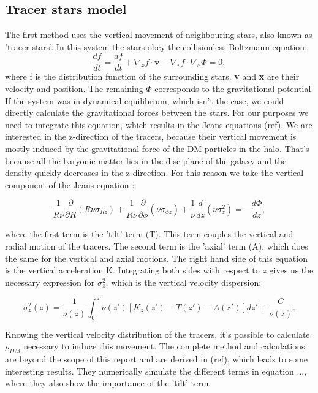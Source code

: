 \documentclass{article}
\begin{document}
\subsection{Tracer stars model}
The first method uses the vertical movement of neighbouring stars, also known as 'tracer stars'. In this system the stars obey the collisionless Boltzmann equation:
\begin{equation}
    \frac{df}{dt} = \frac{df}{dt} + \nabla_{x}f\cdot \textbf{v} - \nabla_{v}f\cdot\nabla_{x}\Phi = 0,
\end{equation}
where f is the distribution function of the surrounding stars. \textbf{v} and \textbf{x} are their velocity and position. The remaining $\Phi$ corresponds to the gravitational potential. If the system was in dynamical equilibrium, which isn't the case, we could directly calculate the gravitational forces between the stars. For our purposes we need to integrate this equation, which results in the Jeans equations (ref). We are interested in the z-direction of the tracers, because their vertical movement is mostly induced by the gravitational force of the DM particles in the halo. That's because all the baryonic matter lies in the disc plane of the galaxy and the density quickly decreases in the z-direction. For this reason we take the vertical component of the Jeans equation \cite{BT2}:

\begin{equation}
    \frac{1}{R\nu}\frac{\partial}{\partial R}(R\nu \sigma_{Rz}) + \frac{1}{R\nu}\frac{\partial}{\partial \phi}(\nu \sigma_{\phi z}) + \frac{1}{\nu}\frac{d}{dz}(\nu \sigma_{z}^{2}) = -\frac{d\Phi}{dz},
\end{equation}

where the first term is the 'tilt' term (T). This term couples the vertical and radial motion of the tracers. The second term is the 'axial' term (A), which does the same for the vertical and axial motions. The right hand side of this equation is the vertical acceleration K. Integrating both sides with respect to $z$ gives us the necessary expression for $\sigma_{z}^{2}$, which is the vertical velocity dispersion:

\begin{equation}
    \sigma_{z}^{2}(z) = \frac{1}{\nu(z)}\int_0^z\nu(z')[K_{z}(z')-T(z')-A(z')]dz' + \frac{C}{\nu(z)}. 
\end{equation}

Knowing the vertical velocity distribution of the tracers, it's possible to calculate $\rho_{DM}$ necessary to induce this movement. The complete method and calculations are beyond the scope of this report and are derived in (ref), which leads to some interesting results. They numerically simulate the different terms in equation ..., where they also show the importance of the 'tilt' term. 
\end{document}
